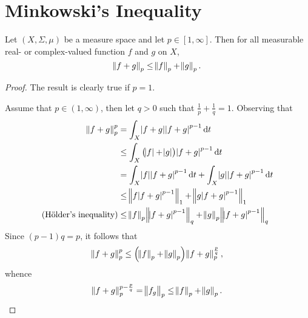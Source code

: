 \section{Minkowski's Inequality}
\begin{thm}
\label{thm:inequality:minkowski_inequality}
Let $(X, \Sigma, \mu)$ be a measure space and let $p \in [1, \infty]$. 
Then for all measurable real- or complex-valued function $f$ and $g$ on $X$, 
\begin{equation*}
    \norm{f + g}_p \le \norm{f}_p + \norm{g}_p. 
\end{equation*}
\end{thm}
\begin{proof}
The result is clearly true if $p = 1$. 

Assume that $p \in (1, \infty)$, then let $q > 0$ such that $\frac{1}{p} + 
\frac{1}{q} = 1$. 
Observing that 
\begin{equation*}
    \begin{aligned}
        \norm{f + g}_p^p &= \int_X \abs{f + g} \abs{f + g}^{p - 1} \mathop{}\!\mathrm{d} t \\ 
        &\le \int_X \left( \abs{f} + \abs{g} \right) \abs{f + g}^{p - 1} \mathop{}\!\mathrm{d} t \\
        &= \int_X \abs{f} \abs{f + g}^{p - 1} \mathop{}\!\mathrm{d} t 
            + \int_X \abs{g} \abs{f + g}^{p - 1} \mathop{}\!\mathrm{d} t \\ 
        &\le \norm{f \abs{f + g}^{p-1}}_1 + \norm{g \abs{f + g}^{p-1}}_1 \\ 
        \text{(Hölder's inequality)} &\le \norm{f}_p \norm{\abs{f + g}^{p-1}}_q 
            + \norm{g}_p \norm{\abs{f + g}^{p-1}}_q 
    \end{aligned}
\end{equation*}
Since $(p - 1)q = p$, it follows that 
\begin{equation*}
    \norm{f + g}_p^p \le \left( \norm{f}_p + \norm{g}_p \right) 
        \norm{f + g}_p^\frac{p}{q}, 
\end{equation*}
whence 
\begin{equation*}
    \norm{f + g}_p^{p - \frac{p}{q}} 
    = \norm{f _ g}_p \le \norm{f}_p + \norm{g}_p. 
\end{equation*}

\end{proof}